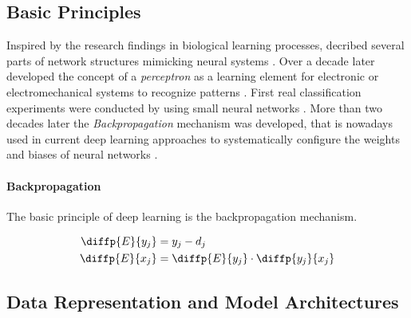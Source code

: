     \subsection{Basic Principles} %

        Inspired by the research findings in biological learning processes, \citeauthor{mcculloch1943logical} decribed several parts of network structures mimicking neural systems \citep{mcculloch1943logical}.
        Over a decade later \citeauthor{rosenblatt1957perceptron} developed the concept of a \emph{perceptron} as a learning element for electronic or electromechanical systems to recognize patterns \citep{rosenblatt1957perceptron}.
        First real classification experiments were conducted by \citeauthor{widrow1960adaptive} using small neural networks \citep{widrow1960adaptive}.
        More than two decades later the \emph{Backpropagation} mechanism was developed, that is nowadays used in current deep learning approaches to systematically configure the weights and biases of neural networks \citep{rumelhart1986learning}.


        \paragraph{Backpropagation} The basic principle of deep learning is the backpropagation mechanism.

        \begin{align}
            \diffp{E}{{y_j}} &= y_j - d_j \\
            \diffp{E}{{x_j}} &= \diffp{E}{{y_j}} \cdot \diffp{{y_j}}{{x_j}}
        \end{align}


    \subsection{Data Representation and Model Architectures} %

